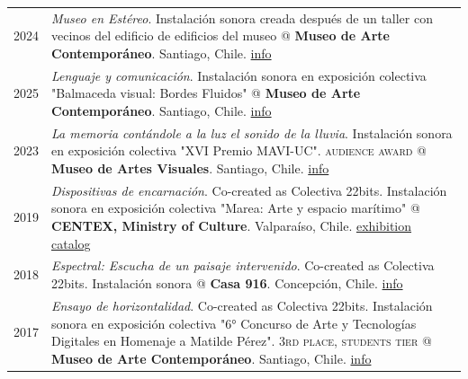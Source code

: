 \documentclass[a4paper,11pt]{article}
\begin{document}
\begin{tabularx}{\linewidth}{@{}l X@{}}
2024 & \textit{Museo en Estéreo}. Instalación sonora creada después de un taller con vecinos del edificio de edificios del museo @  \textbf{Museo de Arte Contemporáneo}. Santiago, Chile. \hfill \normalsize \href{https://misaa.cc/projects/museoenestereo.html}{info} \\

2025 & \textit{Lenguaje y comunicación}. Instalación sonora en exposición colectiva "Balmaceda visual: Bordes Fluidos" @  \textbf{Museo de Arte Contemporáneo}. Santiago, Chile. \hfill \normalsize \href{https://misaa.cc/projects/lenguajeycomunicacion.html}{info} \\

2023 & \textit{La memoria contándole a la luz el sonido de la lluvia}.  Instalación sonora en exposición colectiva "XVI Premio MAVI-UC". \textsc{audience award} @  \textbf{Museo de Artes Visuales}. Santiago, Chile. \hfill \normalsize \href{https://misaa.cc/projects/lamemoria.html}{info} \\

2019 & \textit{Dispositivas de encarnación}. Co-created as Colectiva 22bits. Instalación sonora en exposición colectiva "Marea: Arte y espacio marítimo" @ \textbf{CENTEX, Ministry of Culture}. Valparaíso, Chile. \hfill \normalsize \href{https://centex.cultura.gob.cl/wp-content/uploads/2019/07/catalogo_marea_digital.-1.pdf}{exhibition catalog} \\

2018 & \textit{Espectral: Escucha de un paisaje intervenido}. Co-created as Colectiva 22bits. Instalación sonora @  \textbf{Casa 916}. Concepción, Chile. \hfill \normalsize \href{https://misaa.cc/projects/espectral.html}{info} \\

2017 & \textit{Ensayo de horizontalidad}. Co-created as Colectiva 22bits. Instalación sonora en exposición colectiva "6° Concurso de Arte y Tecnologías Digitales en Homenaje a Matilde Pérez". \textsc{3rd place, students tier} @  \textbf{Museo de Arte Contemporáneo}. Santiago, Chile. \hfill \normalsize \href{https://misaa.cc/projects/edh.html}{info} \\

\end{tabularx}
\end{document}
